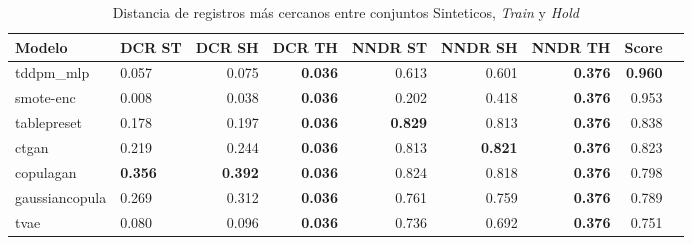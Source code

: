 \begin{table}[H]
\centering
\caption{Distancia de registros más cercanos entre conjuntos Sinteticos, \emph{Train} y \emph{Hold}}
\label{table-dcr-king county-a-1}
\begin{tabular}{|l|l|r|r|r|r|r|r|r|}
\hline
\rowcolor[gray]{0.8}
Modelo & DCR ST & DCR SH & DCR TH & NNDR ST & NNDR SH & NNDR TH & \textbf{Score} \\
\hline tddpm\_mlp & 0.057 & 0.075 & \bfseries 0.036 & 0.613 & 0.601 & \bfseries 0.376 & \bfseries 0.960 \\
\hline smote-enc & \cellcolor[rgb]{0.9, 0.54, 0.52} 0.008 & \cellcolor[rgb]{0.9, 0.54, 0.52} 0.038 & \bfseries 0.036 & 0.202 & 0.418 & \bfseries 0.376 & 0.953 \\
\hline tablepreset & 0.178 & 0.197 & \bfseries 0.036 & \bfseries 0.829 & 0.813 & \bfseries 0.376 & 0.838 \\
\hline ctgan & 0.219 & 0.244 & \bfseries 0.036 & 0.813 & \bfseries 0.821 & \bfseries 0.376 & 0.823 \\
\hline copulagan & \bfseries 0.356 & \bfseries 0.392 & \bfseries 0.036 & 0.824 & 0.818 & \bfseries 0.376 & 0.798 \\
\hline gaussiancopula & 0.269 & 0.312 & \bfseries 0.036 & 0.761 & 0.759 & \bfseries 0.376 & 0.789 \\
\hline tvae & 0.080 & 0.096 & \bfseries 0.036 & 0.736 & 0.692 & \bfseries 0.376 & 0.751 \\
\hline
\end{tabular}
\end{table}
